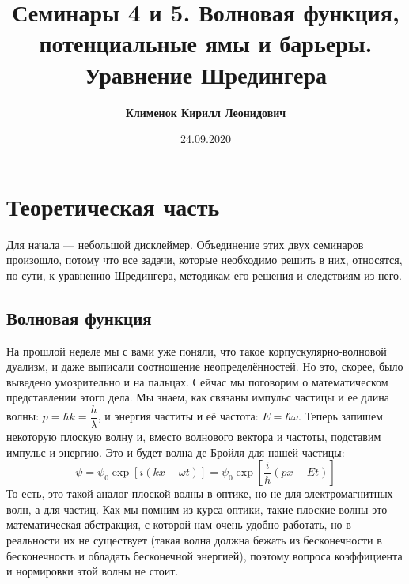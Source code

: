 \documentclass[12pt]{article}
\begin{document}
 
\title{\textbf{Семинары 4 и 5. Волновая функция, потенциальные ямы и барьеры. Уравнение Шредингера}}
\author{\textbf{Клименок Кирилл Леонидович}}
\date{24.09.2020}
\maketitle

\section{Теоретическая часть}
Для начала --- небольшой дисклеймер. Объединение этих двух семинаров произошло, потому что все задачи, которые необходимо решить в них, относятся, по сути, к уравнению Шредингера, методикам его решения и следствиям из него. 

\subsection{Волновая функция}
На прошлой неделе мы с вами уже поняли, что такое корпускулярно-волновой дуализм, и даже выписали соотношение неопределённостей. Но это, скорее, было выведено умозрительно и на пальцах. Сейчас мы поговорим о математическом представлении этого дела. Мы знаем, как связаны импульс частицы и ее длина волны: $p  = \hbar k = \dfrac{h}{\lambda}$\vspace{1mm}, и энергия частиты и её частота: $E  = \hbar \omega$. Теперь запишем некоторую плоскую волну и, вместо волнового вектора и частоты, подставим импульс и энергию. Это и будет волна де Бройля для нашей частицы:
\begin{equation}
\label{eq:sem_04_psi}
    \psi = \psi_0 \exp{\left[i\left(kx - \omega t \right)\right]} =\psi_0 \exp{\left[\dfrac{i}{\hbar}\left(px - Et \right)\right]}
\end{equation}
То есть, это такой аналог плоской волны в оптике, но не для электромагнитных волн, а для частиц. Как мы помним из курса оптики, такие плоские волны это математическая абстракция, с которой нам очень удобно работать, но в реальности их не существует (такая волна должна бежать из бесконечности в бесконечность и обладать бесконечной энергией), поэтому вопроса коэффициента и нормировки этой волны не стоит. 
\end{document}
